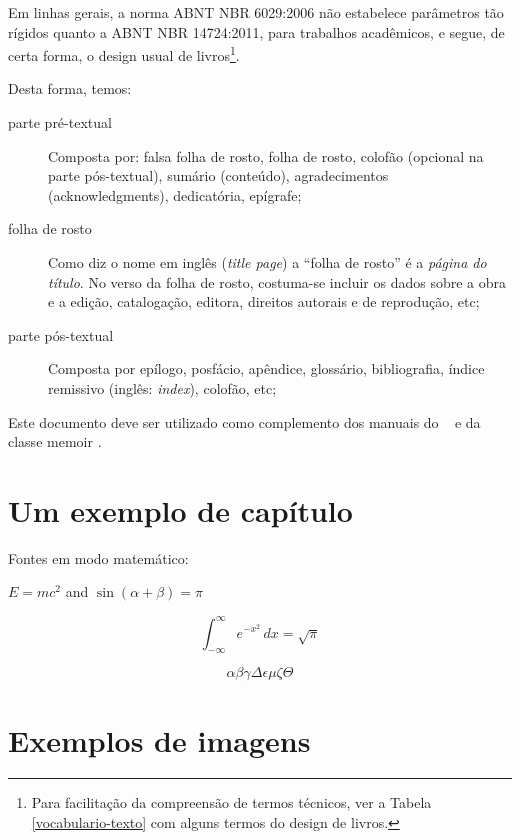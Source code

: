 \documentclass[
	10pt,				%
	openright,			%
	twoside,			%
	a5paper,			%
	english,			%
	french,				%
	brazil,				%
	sumario=tradicional
]{abntex2}
\begin{document}
Em linhas gerais, a norma ABNT NBR 6029:2006 não estabelece parâmetros tão
rígidos quanto a ABNT NBR 14724:2011, para trabalhos acadêmicos, e segue, de
certa forma, o design usual de livros\footnote{Para facilitação da compreensão
de termos técnicos, ver a Tabela \ref{vocabulario-texto} com alguns termos do
design de livros.}.

Desta forma, temos:

\begin{description}
\item[parte pré-textual] Composta por: falsa folha de rosto, folha de rosto,
colofão (opcional na parte pós-textual), sumário (conteúdo),
a\-gra\-de\-ci\-men\-tos (acknowledgments), dedicatória, epígrafe;
\item[folha de rosto] Como diz o nome em inglês (\textit{title page}) a ``folha
de rosto'' é a \textit{página do título}. No verso da folha de rosto, costuma-se
incluir os dados sobre a obra e a edição, catalogação, editora, direitos
autorais e de reprodução, etc;
\item [parte pós-textual] Composta por epílogo, posfácio, apêndice, glossário,
bibliografia, índice remissivo (inglês: \textit{index}), colofão, etc;

\end{description}

Este documento deve ser utilizado como complemento dos manuais do \abnTeX\ 
\cite{abntex2classe,abntex2cite,abntex2cite-alf} e da classe \textsf{memoir}
\cite{memoir}. 

  
\chapter{Um exemplo de capítulo}

Fontes em modo matemático:

$E=mc^2$ and $\sin(\alpha+\beta)=\pi$

\[
\int_{-\infty}^{\infty}e^{-x^2}\,dx=\sqrt{\pi}
\]

\[
\alpha \beta \gamma \Delta \epsilon \mu \zeta \Theta
\]

\lipsum[1-10]

\chapter{Exemplos de imagens}
\end{document}

